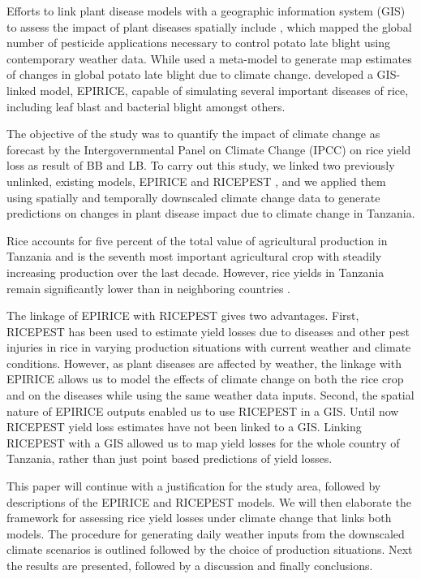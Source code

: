 \documentclass[preprint,12pt]{elsarticle}
\begin{document}
Efforts to link plant disease models with a geographic information system (GIS) to assess the impact of plant diseases spatially include  \citet{Hijmans2000}, which mapped the global number of pesticide applications necessary to control potato late blight using contemporary weather data. While \citet{Sparks2014} used a meta-model to generate map estimates of changes in global potato late blight due to climate change. \citet{Savary2012} developed a GIS-linked model, EPIRICE, capable of simulating several important diseases of rice, including leaf blast and bacterial blight amongst others.

The objective of the study was to quantify the impact of climate change as forecast by the Intergovernmental Panel on Climate Change (IPCC) on rice yield loss as result of BB and LB. To carry out this study, we linked two previously unlinked, existing models, EPIRICE and RICEPEST \cite{Willocquet2000, Willocquet2002}, and we applied them using spatially and temporally downscaled climate change data to generate predictions on changes in plant disease impact due to climate change in Tanzania.

Rice accounts for five percent of the total value of agricultural production in Tanzania and is the seventh most important agricultural crop with steadily increasing production over the last decade. However, rice yields in Tanzania remain significantly lower than in neighboring countries \cite{Barreiro-Hurle2012}.

The linkage of EPIRICE with RICEPEST gives two advantages. First, RICEPEST has been used to estimate yield losses due to diseases and other pest injuries in rice in varying production situations with current weather and climate conditions. However, as plant diseases are affected by weather, the linkage with EPIRICE allows us to model the effects of climate change on both the rice crop and on the diseases while using the same weather data inputs. Second, the spatial nature of EPIRICE outputs enabled us to use RICEPEST in a GIS. Until now RICEPEST yield loss estimates have not been linked to a GIS. Linking RICEPEST with a GIS allowed us to map yield losses for the whole country of Tanzania, rather than just point based predictions of yield losses.

This paper will continue with a justification for the study area, followed by descriptions of the EPIRICE and RICEPEST models. We will then elaborate the framework for assessing rice yield losses under climate change that links both models. The procedure for generating daily weather inputs from the downscaled climate scenarios is outlined followed by the choice of production situations. Next the results are presented, followed by a discussion and finally conclusions.
\end{document}
